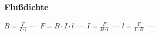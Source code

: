 \subsubsection{Flußdichte} 
\begin{minipage}{0.45\textwidth} 
\end{minipage} 
\begin{minipage}{0.45\textwidth} 
 
\end{minipage} 
$ B = \frac{ F}{I\cdot l} $ \textcolor{lightgray}{\textbf{---}} 
$ F = B\cdot I\cdot l $ \textcolor{lightgray}{\textbf{---}} 
$ I = \frac{ F}{B\cdot l} $ \textcolor{lightgray}{\textbf{---}} 
$ l = \frac{ F}{I\cdot B} $ \textcolor{lightgray}{\textbf{---}} 

